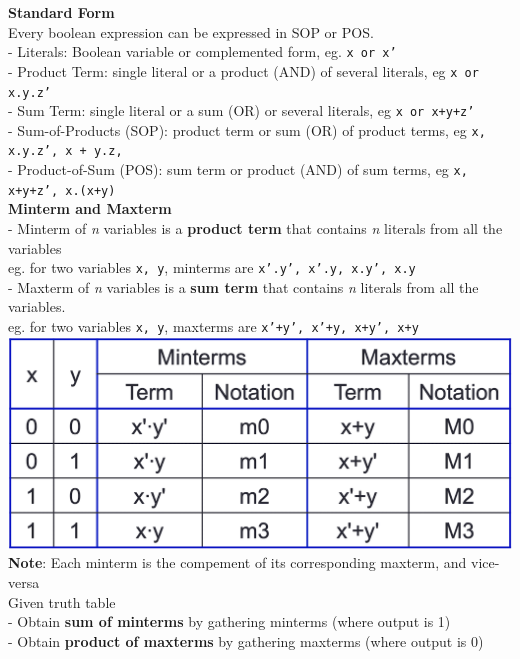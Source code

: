 \documentclass[10pt, a4paper]{article}
\newcommand{\highlight}[1]{{\color{red}\textbf{#1}}}
\begin{document}
\begin{multicols*}{3}
		\textbf{Standard Form}\\
		Every boolean expression can be expressed in SOP or POS.\\
		- Literals: Boolean variable or complemented form, eg. \texttt{x or x'}\\
		- Product Term: single literal or a product (AND) of several literals, eg \texttt{x or x.y.z'}\\
		- Sum Term: single literal or a sum (OR) or several literals, eg \texttt{x or x+y+z'}\\
		- Sum-of-Products (SOP): product term or sum (OR) of product terms, eg \texttt{x, x.y.z', x + y.z,}\\
		- Product-of-Sum (POS): sum term or product (AND) of sum terms, eg \texttt{x, x+y+z', x.(x+y)}\\
		
		\textbf{Minterm and Maxterm}\\
		- Minterm of \textit{n} variables is a \textbf{product term} that contains \textit{n} literals from all the variables\\
		eg. for two variables \texttt{x, y}, minterms are \texttt{x'.y', x'.y, x.y', x.y}\\
		- Maxterm of \textit{n} variables is a \textbf{sum term} that contains \textit{n} literals from all the variables.\\
		eg. for two variables \texttt{x, y}, maxterms are \texttt{x'+y', x'+y, x+y', x+y}\\
		
		\includegraphics[scale=.35]{./assets/mintermAndMaxterm}\\
		
		\highlight{Note}: Each minterm is the compement of its corresponding maxterm, and vice-versa\\

		Given truth table\\
		- Obtain \textbf{sum of minterms} by gathering minterms (where output is 1)\\
		- Obtain \textbf{product of maxterms} by gathering maxterms (where output is 0)\\
		

\end{multicols*}
\end{document}
